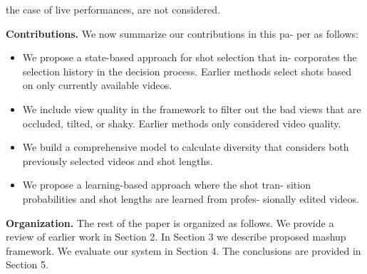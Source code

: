\documentclass{sig-alternate}
\begin{document}
the case of live performances, are not considered.\par
\textbf{Contributions.} We now summarize our contributions in this pa-
per as follows:
\begin{itemize}
    \item We propose a state-based approach for shot selection that in-
corporates the selection history in the decision process. Earlier methods select shots based on only currently available
videos.
\item We include view quality in the framework to filter out the
bad views that are occluded, tilted, or shaky. Earlier methods
only considered video quality.
\item We build a comprehensive model to calculate diversity that
considers both previously selected videos and shot lengths.
\item We propose a learning-based approach where the shot tran-
sition probabilities and shot lengths are learned from profes-
sionally edited videos.
\end{itemize}
\textbf{Organization.} The rest of the paper is organized as follows.
We provide a review of earlier work in Section 2. In Section 3 we
describe proposed mashup framework. We evaluate our system in
Section 4. The conclusions are provided in Section 5.
\end{document}
